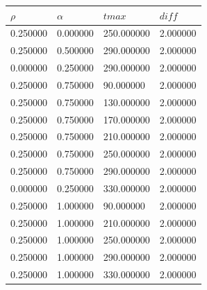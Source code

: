 \documentclass[12pt]{report}
\begin{document}
\begin{center}
	
	\begin{table}[h!]
		\begin{center}
			\begin{tabular}{|llll|}
				\hline
				\multicolumn{1}{|l|}{$\rho$}      & \multicolumn{1}{l|}{$\alpha$} & \multicolumn{1}{l|}{$tmax$} & $diff$    \\ \hline
				\multicolumn{1}{|c}{0.250000} & 0.000000                   & 250.000000                & 2.000000 \\
				
				0.250000                      & 0.500000                   & 290.000000                & 2.000000 \\
				0.000000                      & 0.250000                   & 290.000000                & 2.000000 \\
				0.250000                      & 0.750000                   & 90.000000                 & 2.000000 \\
				0.250000                      & 0.750000                   & 130.000000                & 2.000000 \\
				0.250000                      & 0.750000                   & 170.000000                & 2.000000 \\
				0.250000                      & 0.750000                   & 210.000000                & 2.000000 \\
				0.250000                      & 0.750000                   & 250.000000                & 2.000000 \\
				0.250000                      & 0.750000                   & 290.000000                & 2.000000 \\
				0.000000                      & 0.250000                   & 330.000000                & 2.000000 \\
				0.250000                      & 1.000000                   & 90.000000                 & 2.000000 \\
				0.250000                      & 1.000000                   & 210.000000                & 2.000000 \\
				0.250000                      & 1.000000                   & 250.000000                & 2.000000 \\
				0.250000                      & 1.000000                   & 290.000000                & 2.000000 \\
				0.250000                      & 1.000000                   & 330.000000                & 2.000000 \\

\end{tabular}
\end{center}
\end{table}
\end{center}
\end{document}
